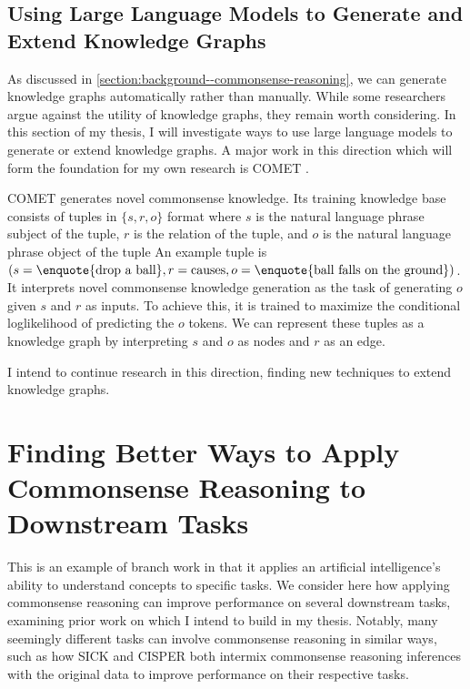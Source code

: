 \documentclass[12pt]{report}
\begin{document}
\section{Using Large Language Models to Generate and Extend Knowledge Graphs}

As discussed in \cref{section:background--commonsense-reasoning}, we can generate knowledge graphs automatically rather than manually.
While some researchers argue against the utility of knowledge graphs, they remain worth considering.
In this section of my thesis, I will investigate ways to use large language models to generate or extend knowledge graphs.
A major work in this direction which will form the foundation for my own research is COMET \cite{Bosselut2019-he}.

COMET generates novel commonsense knowledge.
Its training knowledge base consists of tuples in $\{s, r, o\}$ format where $s$ is the natural language phrase subject of the tuple, $r$ is the relation of the tuple, and $o$ is the natural language phrase object of the tuple
An example tuple is $(s=\text{\enquote{drop a ball}}, r=\text{causes}, o=\text{\enquote{ball falls on the ground}})$.
It interprets novel commonsense knowledge generation as the task of generating $o$ given $s$ and $r$ as inputs.
To achieve this, it is trained to maximize the conditional loglikelihood of predicting the $o$ tokens.
We can represent these tuples as a knowledge graph by interpreting $s$ and $o$ as nodes and $r$ as an edge.

I intend to continue research in this direction, finding new techniques to extend knowledge graphs.


\chapter{Finding Better Ways to Apply Commonsense Reasoning to Downstream Tasks}
\label{chapter:downstream-tasks}

This is an example of branch work in that it applies an artificial intelligence's ability to understand concepts to specific tasks.
We consider here how applying commonsense reasoning can improve performance on several downstream tasks, examining prior work on which I intend to build in my thesis.
Notably, many seemingly different tasks can involve commonsense reasoning in similar ways, such as how SICK \cite{Kim2022-pz} and CISPER \cite{Yi2022-tv} both intermix commonsense reasoning inferences with the original data to improve performance on their respective tasks.
\end{document}
